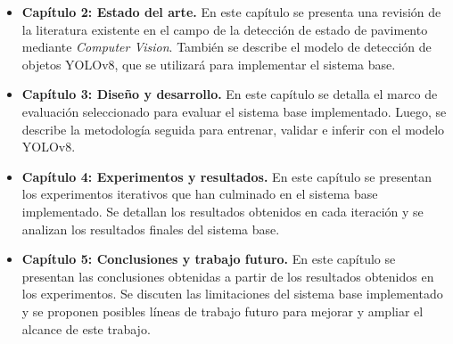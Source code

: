 \begin{itemize}
    \item \textbf{Capítulo 2: Estado del arte.} En este capítulo se presenta una revisión de la literatura existente en el campo de la detección de estado de pavimento mediante \textit{Computer Vision}. También se describe el modelo de detección de objetos YOLOv8, que se utilizará para implementar el sistema base.
    
    \item \textbf{Capítulo 3: Diseño y desarrollo.} En este capítulo se detalla el marco de evaluación seleccionado para evaluar el sistema base implementado. Luego, se describe la metodología seguida para entrenar, validar e inferir con el modelo YOLOv8.
    
    \item \textbf{Capítulo 4: Experimentos y resultados.} En este capítulo se presentan los experimentos iterativos que han culminado en el sistema base implementado. Se detallan los resultados obtenidos en cada iteración y se analizan los resultados finales del sistema base.
    
    \item \textbf{Capítulo 5: Conclusiones y trabajo futuro.} En este capítulo se presentan las conclusiones obtenidas a partir de los resultados obtenidos en los experimentos. Se discuten las limitaciones del sistema base implementado y se proponen posibles líneas de trabajo futuro para mejorar y ampliar el alcance de este trabajo.
\end{itemize}
